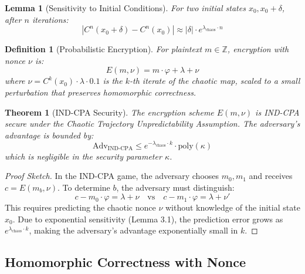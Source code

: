 \documentclass{article}
\newtheorem{theorem}{Theorem}[section]
\newtheorem{definition}{Definition}[section]
\newtheorem{lemma}{Lemma}[section]
\begin{document}
\begin{lemma}[Sensitivity to Initial Conditions]
For two initial states $x_0, x_0 + \delta$, after $n$ iterations:
\begin{equation}
|C^n(x_0 + \delta) - C^n(x_0)| \approx |\delta| \cdot e^{\lambda_{\text{chaos}} \cdot n}
\end{equation}
\end{lemma}

\begin{definition}[Probabilistic Encryption]
For plaintext $m \in \mathbb{Z}$, encryption with nonce $\nu$ is:
\begin{equation}
E(m, \nu) = m \cdot \varphi + \lambda + \nu
\end{equation}
where $\nu = C^k(x_0) \cdot \lambda \cdot 0.1$ is the $k$-th iterate of the chaotic map, scaled to a small perturbation that preserves homomorphic correctness.
\end{definition}

\begin{theorem}[IND-CPA Security]
The encryption scheme $E(m, \nu)$ is IND-CPA secure under the Chaotic Trajectory Unpredictability Assumption. The adversary's advantage is bounded by:
\begin{equation}
\text{Adv}_{\text{IND-CPA}} \leq e^{-\lambda_{\text{chaos}} \cdot k} \cdot \text{poly}(\kappa)
\end{equation}
which is negligible in the security parameter $\kappa$.
\end{theorem}

\begin{proof}[Proof Sketch]
In the IND-CPA game, the adversary chooses $m_0, m_1$ and receives $c = E(m_b, \nu)$. To determine $b$, the adversary must distinguish:
\begin{equation}
c - m_0 \cdot \varphi = \lambda + \nu \quad \text{vs} \quad c - m_1 \cdot \varphi = \lambda + \nu'
\end{equation}
This requires predicting the chaotic nonce $\nu$ without knowledge of the initial state $x_0$. Due to exponential sensitivity (Lemma 3.1), the prediction error grows as $e^{\lambda_{\text{chaos}} \cdot k}$, making the adversary's advantage exponentially small in $k$.
\end{proof}

\subsection{Homomorphic Correctness with Nonce}
\end{document}
